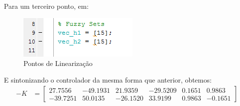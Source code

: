 \documentclass[11pt,]{article}
\begin{document}
	Para um terceiro ponto, em:
	\begin{figure}[H]
		\centering
		\includegraphics[scale=1]{cod_fuz_15.png}
		\caption{Pontos de Linearização}
		\label{CodigoLin15_2}
	\end{figure}
	
	E sintonizando o controlador da mesma forma que anterior, obtemos:
	\begin{align*}
	-K &= 
	\begin{bmatrix}
	 27.7556 & -49.1931 & 21.9359 & -29.5209 & 0.1651 & 0.9863\\
	 -39.7251 & 50.0135 & -26.1520 & 33.9199 & 0.9863 & -0.1651
	\end{bmatrix}
	\end{align*}
	
\end{document}

